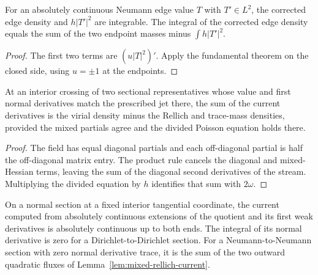 \begin{lemma}
\label{lem:mixed-rellich-edge}
\leanok
For an absolutely continuous Neumann edge value $T$ with $T'\in L^2$,
the corrected edge density and $h|T'|^2$ are integrable. The integral of
the corrected edge density equals the sum of the two endpoint masses
minus $\int h|T'|^2$.
\end{lemma}

\begin{proof}
\leanok
The first two terms are $(u|T|^2)'$. Apply the fundamental theorem
on the closed side, using $u=\pm1$ at the endpoints.
\end{proof}

\begin{lemma}
\label{lem:mixed-rellich-divergence}
\leanok
At an interior crossing of two sectional representatives whose value
and first normal derivatives match the prescribed jet there, the sum
of the current derivatives is the virial density minus the Rellich
and trace-mass densities, provided the mixed partials agree and the
divided Poisson equation holds there.
\end{lemma}

\begin{proof}
\leanok
The field has equal diagonal partials and each off-diagonal partial
is half the off-diagonal matrix entry. The product rule cancels the
diagonal and mixed-Hessian terms, leaving the sum of the diagonal
second derivatives of the stream. Multiplying the divided equation
by $h$ identifies that sum with $2\omega$.
\end{proof}

\begin{lemma}
\label{lem:mixed-rellich-section}
\leanok
On a normal section at a fixed interior tangential coordinate, the
current computed from absolutely continuous extensions of the quotient
and its first weak derivatives is absolutely continuous up to both
ends. The integral of its normal derivative is zero for a
Dirichlet-to-Dirichlet section. For a Neumann-to-Neumann section with
zero normal derivative trace, it is the sum of the two outward
quadratic fluxes of Lemma~\ref{lem:mixed-rellich-current}.
\end{lemma}

